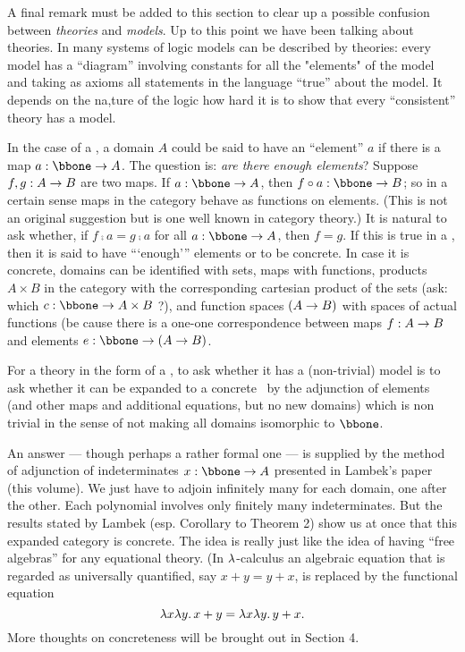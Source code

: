 A final remark must be added to this section to clear up a possible confusion between {\it theories} and {\it models}.
Up to this point we have been talking about theories. In many systems of logic models can be described by theories: every model has a ``diagram'' involving constants for all the "elements" of the model and taking as axioms all statements in the language ``true'' about the model. It depends on the na,ture of the logic how hard it is to show that every ``consistent'' theory has a model.

In the case of a \ccc, a domain $A$ could be said to have an ``element'' $a$ if there is a map $a: \bbone \to A$. The question is: {\it are there enough elements}? Suppose $f,g: A \rightarrow B$ are two maps. If $a : \bbone \to A$, then $f \comp a: \bbone \to B$; so in a certain sense maps in the category behave as functions on elements. (This is not an original suggestion but is one well known in category theory.) It is natural to ask whether, if  $f \comp a	= g\comp a$ for all $a : \bbone \to A$, then $f = g$. If this is true in a \ccc, then it is said to have ```enough''' elements or to be concrete. In case it is concrete, domains can be identified with sets, maps with functions, products $A \times B$ in the category with the corresponding cartesian product of the sets (ask: which $c : \bbone \to A \times B$ ?), and function spaces $(A \rightarrow B)$ with spaces of actual functions (be cause there is a one-one correspondence between maps $f : A \rightarrow B$ and elements $e: \bbone \to (\AB)$.

For a theory in the form of a \ccc, to ask whether it has a (non-trivial) model is to ask whether it can be expanded to a concrete \ccc\ by the adjunction of elements (and other maps and additional equations, but no new domains) which is non trivial in the sense of not making all domains isomorphic to $\bbone$.

An answer --- though perhaps a rather formal one --- is supplied by the method of adjunction of indeterminates $x: \bbone \to A$ presented in Lambek's paper (this volume). We just have to adjoin infinitely many for each domain, one after the other. Each polynomial involves only finitely many indeterminates. But the results stated by Lambek (esp. Corollary to Theorem 2) show us at once that this expanded category is concrete. The idea is really just like the idea of having ``free algebras'' for any equational theory. (In $\lambda$-calculus an algebraic equation that is regarded as universally quantified, say $x + y = y + x$, is replaced by the functional equation
$$
\lambda x \lambda y . \, x + y = \lambda x \lambda y . \, y + x.
$$
%
More thoughts on concreteness will be brought out in Section 4.

